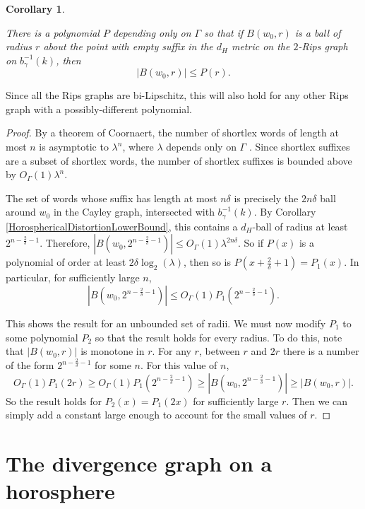 \documentclass[10pt,a4paper]{amsart}
\newtheorem{corollary}[theorem]{Corollary}
\theoremstyle{definition}
\theoremstyle{remark}
\begin{document}
	\begin{corollary} \label{RipsGraphGrowth}
		
		There is a polynomial $P$ depending only on $\Gamma$ so that if $B(w_0, r)$ is a ball of radius $r$ about the point with empty suffix in the $d_H$ metric on the $2$-Rips graph on $b_\gamma^{-1}(k)$, then 
        $$ |B(w_0, r)|\le P(r).$$
		
	\end{corollary}
	
	Since all the Rips graphs are bi-Lipschitz, this will also hold for any other Rips graph with a possibly-different polynomial.
	
	\begin{proof}
		
		By a theorem of Coornaert, the number of shortlex words of length at most $n$ is asymptotic to $\lambda^n$, where $\lambda$ depends only on $\Gamma$ \cite{Coornaert}. Since shortlex suffixes are a subset of shortlex words, the number of shortlex suffixes is bounded above by $O_\Gamma(1)\lambda^n$. 
        
        The set of words whose suffix has length at most $n\delta$ is precisely the $2n\delta$ ball around $w_0$ in the Cayley graph, intersected with $b_\gamma^{-1}(k)$. By Corollary \ref{HorosphericalDistortionLowerBound}, this contains a $d_H$-ball of radius at least $2^{n-\frac{2}{\delta} -1}$. Therefore, $|B(w_0, 2^{n-\frac{2}{\delta}-1})|\le O_\Gamma(1)\lambda^{2n\delta}$. So if $P(x)$ is a polynomial of order at least $2\delta\log_2(\lambda)$, then so is $P(x+\frac{2}{\delta}+1)=P_1(x)$. In particular, for sufficiently large $n$, $$|B(w_0, 2^{n-\frac{2}{\delta}-1})|\le O_\Gamma(1)P_1(2^{n-\frac{2}{\delta}-1}).$$
		
		This shows the result for an unbounded set of radii. We must now modify $P_1$ to some polynomial $P_2$ so that the result holds for every radius. To do this, note that $|B(w_0, r)|$ is monotone in $r$. For any $r$, between $r$ and $2r$ there is a number of the form $2^{n-\frac{2}{\delta}-1}$ for some $n$. For this value of $n$, $$O_\Gamma(1)P_1(2r)\ge O_\Gamma(1)P_1(2^{n-\frac{2}{\delta}-1}) \ge |B(w_0, 2^{n-\frac{2}{\delta}-1})|\ge |B(w_0, r)|.$$ So the result holds for $P_2(x)=P_1(2x)$ for sufficiently large $r$. Then we can simply add a constant large enough to account for the small values of $r$.
		\end{proof}
	
	\section{The divergence graph on a horosphere}
	\label{sec:DivergenceGraph}
\end{document}
